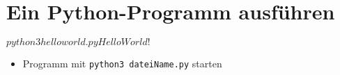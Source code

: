 %

\section{Ein Python-Programm ausführen}
\begin{frame}[fragile]
	\slidehead
	\begin{bashcode}
		$ python3 helloworld.py
		Hello World!
		$
	\end{bashcode}

	\begin{itemize}
		\item Programm mit \texttt{python3 dateiName.py} starten
	\end{itemize}
\end{frame}

